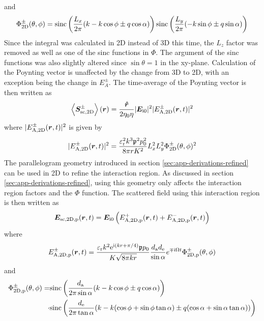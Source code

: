 \documentclass[11pt,twoside]{eitExjobb}
\begin{document}
	and
	\begin{equation*}
		\Phi_{\mathrm{2D}}^\pm (\theta,\phi) = \text{sinc} \left( \frac{L_{x}}{2\pi} ( k - k\cos{\phi} \pm q\cos{\alpha} ) \right) \text{sinc} \left( \frac{L_{y}}{2\pi} ( - k\sin{\phi} \pm q\sin{\alpha} ) \right)
	\end{equation*}
	Since the integral was calculated in 2D instead of 3D this time, the $L_z$ factor was removed as well as one of the sinc functions in $\Phi$. The argument of the sinc functions was also slightly altered since $\sin{\theta} = 1$ in the xy-plane. Calculation of the Poynting vector is unaffected by the change from 3D to 2D, with an exception being the change in $E_A^\pm$. The time-average of the Poynting vector is then written as
	\begin{equation*}
		\left< \bm{S}_{\mathrm{sc,2D}}^\pm \right> (\bm{r}) = \frac{\bm{\hat{r}}}{2\eta_0 \eta} |\bm{E}_{\mathrm{i}0}|^2 |E_{\mathrm{A,2D}}^\pm (\bm{r},t)|^2
	\end{equation*}
	where $|E_{\mathrm{A,2D}}^\pm (\bm{r},t)|^2$ is given by
	\begin{equation*}
		|E_{\mathrm{A,2D}}^\pm (\bm{r},t)|^2 = \frac{\varepsilon_{\mathrm{r}}^2 k^3 \mathfrak{p}^2 p_0^2}{8\pi r K^2} L_{x}^2 L_{y}^2 \Phi_{\mathrm{2D}}^\pm (\theta,\phi)^2
	\end{equation*}
	The parallelogram geometry introduced in section \ref{sec:app-derivations-refined} can be used in 2D to refine the interaction region. As discussed in section \ref{sec:app-derivations-refined}, using this geometry only affects the interaction region factors and the $\Phi$ function. The scattered field using this interaction region is then written as
	\begin{equation*}
		\bm{E}_{\mathrm{sc,2D,p}} (\bm{r},t) = \bm{E}_{\mathrm{i}0} \left( E_{\mathrm{A,2D,p}}^+ (\bm{r},t) + E_{\mathrm{A,2D,p}}^- (\bm{r},t) \right)
	\end{equation*}
	where
	\begin{equation*}
		E_{\mathrm{A,2D,p}}^\pm (\bm{r},t) = \frac{\varepsilon_{\mathrm{r}}k^2 \mathrm{e}^{\mathrm{i} (kr + \pi/4)} \mathfrak{p} p_0}{K \sqrt{8\pi kr}} \frac{d_{\mathrm{a}} d_{\mathrm{e}}}{\sin{\alpha}} e^{\mp \mathrm{i} \Omega t} \Phi_{\mathrm{2D,p}}^\pm (\theta,\phi)
	\end{equation*}
	and
	\begin{equation*}
	\begin{split}
		\Phi_{\mathrm{2D,p}}^\pm (\theta,\phi) = &\text{sinc}\left( \frac{d_{\mathrm{a}}}{2\pi \sin{\alpha}}(k - k\cos{\phi} \pm q\cos{\alpha}) \right) \\
		\cdot &\text{sinc}\left( \frac{d_{\mathrm{e}}}{2\pi \tan{\alpha}}
		(k - k(\cos{\phi} + \sin{\phi}\tan{\alpha}) \pm q(\cos{\alpha} + \sin{\alpha}\tan{\alpha})) \right)
	\end{split}
	\end{equation*}
\end{document}
